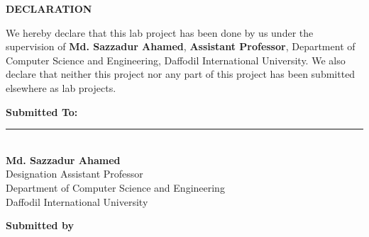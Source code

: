 
\vspace*{1.5cm} 


\begin{center}
    {\LARGE \textbf{DECLARATION}}\\
\end{center}

\onehalfspacing

\noindent We hereby declare that this lab project has been done by us under the supervision of \textbf{Md. Sazzadur Ahamed}, \textbf{Assistant Professor}, Department of Computer Science and Engineering, Daffodil International University. We also declare that neither this project nor any part of this project has been submitted elsewhere as lab projects. 

\vspace{.8cm}

\noindent \textbf{Submitted To:} \\[1cm]

\noindent\rule{6cm}{0.4pt}\\
\textbf{Md. Sazzadur Ahamed} \\
Designation Assistant Professor\\
Department of Computer Science and Engineering \\
Daffodil International University \\

\vspace{.5cm}

\begin{center}
    \textbf{Submitted by}
\end{center}

\vspace{.2cm}

